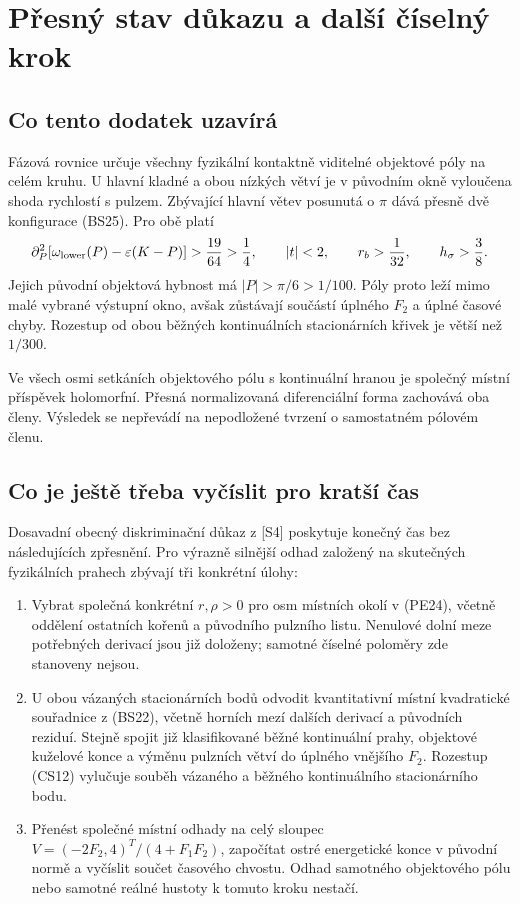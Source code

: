 \documentclass[11pt,a4paper]{article}
\theoremstyle{remark}\newtheorem{remark}[theorem]{Poznámka}
\numberwithin{equation}{section}
\begin{document}
\section{Přesný stav důkazu a další číselný krok}

\subsection{Co tento dodatek uzavírá}

Fázová rovnice určuje všechny fyzikální kontaktně viditelné
objektové póly na celém kruhu. U hlavní kladné a obou nízkých
větví je v původním okně vyloučena shoda rychlostí s pulzem.
Zbývající hlavní větev posunutá o \(\pi\) dává přesně dvě
konfigurace (BS25). Pro obě platí
\[
\partial_P^2[\omega_{\rm lower}(P)-\varepsilon(K-P)]
>\frac{19}{64}>\frac14,\qquad
|t|<2,\qquad r_b>\frac1{32},\qquad h_\sigma>\frac38.
\]
Jejich původní objektová hybnost má \(|P|>\pi/6>1/100\).
Póly proto leží mimo malé vybrané výstupní okno, avšak zůstávají
součástí úplného \(F_2\) a úplné časové chyby. Rozestup od obou
běžných kontinuálních stacionárních křivek je větší než \(1/300\).

Ve všech osmi setkáních objektového pólu s kontinuální hranou
je společný místní příspěvek holomorfní. Přesná normalizovaná
diferenciální forma zachovává oba členy. Výsledek se nepřevádí
na nepodložené tvrzení o samostatném pólovém členu.

\subsection{Co je ještě třeba vyčíslit pro kratší čas}

Dosavadní obecný diskriminační důkaz z [S4] poskytuje konečný
čas bez následujících zpřesnění. Pro výrazně silnější odhad
založený na skutečných fyzikálních prahech zbývají tři konkrétní
úlohy:
\begin{enumerate}
\item Vybrat společná konkrétní \(r,\rho>0\) pro osm místních
okolí v (PE24), včetně oddělení ostatních kořenů a původního
pulzního listu. Nenulové dolní meze potřebných derivací jsou
již doloženy; samotné číselné poloměry zde stanoveny nejsou.
\item U obou vázaných stacionárních bodů odvodit kvantitativní
místní kvadratické souřadnice z (BS22), včetně horních mezí
dalších derivací a původních reziduí. Stejně spojit již
klasifikované běžné kontinuální prahy, objektové kuželové
konce a výměnu pulzních větví do úplného vnějšího \(F_2\).
Rozestup (CS12) vylučuje souběh vázaného a běžného
kontinuálního stacionárního bodu.
\item Přenést společné místní odhady na celý sloupec
\(V=(-2F_2,4)^T/(4+F_1F_2)\), započítat ostré energetické
konce v původní normě a vyčíslit součet časového chvostu.
Odhad samotného objektového pólu nebo samotné reálné hustoty
k tomuto kroku nestačí.
\end{enumerate}
\end{document}

